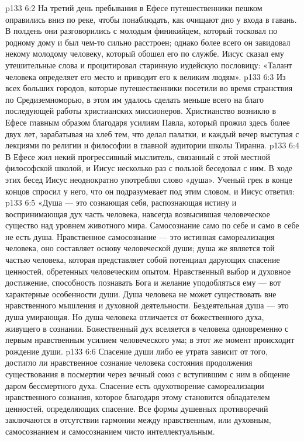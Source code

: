 \vs p133 6:2 На третий день пребывания в Ефесе путешественники пешком оправились вниз по реке, чтобы понаблюдать, как очищают дно у входа в гавань. В полдень они разговорились с молодым финикийцем, который тосковал по родному дому и был чем\hyp{}то сильно расстроен; однако более всего он завидовал некому молодому человеку, который обошел его по службе. Иисус сказал ему утешительные слова и процитировал старинную иудейскую пословицу: «Талант человека определяет его место и приводит его к великим людям».
\vs p133 6:3 Из всех больших городов, которые путешественники посетили во время странствия по Средиземноморью, в этом им удалось сделать меньше всего на благо последующей работы христианских миссионеров. Христианство возникло в Ефесе главным образом благодаря усилиям Павла, который прожил здесь более двух лет, зарабатывая на хлеб тем, что делал палатки, и каждый вечер выступая с лекциями по религии и философии в главной аудитории школы Тиранна.
\vs p133 6:4 В Ефесе жил некий прогрессивный мыслитель, связанный с этой местной философской школой, и Иисус несколько раз с пользой беседовал с ним. В ходе этих бесед Иисус неоднократно употреблял слово «душа». Ученый грек в конце концов спросил у него, что он подразумевает под этим словом, и Иисус ответил:
\vs p133 6:5 \pc «Душа --- это сознающая себя, распознающая истину и воспринимающая дух часть человека, навсегда возвысившая человеческое существо над уровнем животного мира. Самосознание само по себе и само в себе не есть душа. Нравственное самосознание --- это истинная самореализация человека, оно составляет основу человеческой души; душа же является той частью человека, которая представляет собой потенциал дарующих спасение ценностей, обретенных человеческим опытом. Нравственный выбор и духовное достижение, способность познавать Бога и желание уподобляться ему --- вот характерные особенности души. Душа человека не может существовать вне нравственного мышления и духовной деятельности. Бездеятельная душа --- это душа умирающая. Но душа человека отличается от божественного духа, живущего в сознании. Божественный дух вселяется в человека одновременно с первым нравственным усилием человеческого ума; в этот же момент происходит рождение души.
\vs p133 6:6 Спасение души либо ее утрата зависит от того, достигло ли нравственное сознание человека состояния продолжения существования в посмертии через вечный союз с вступившим с ним в общение даром бессмертного духа. Спасение есть одухотворение самореализации нравственного сознания, которое благодаря этому становится обладателем ценностей, определяющих спасение. Все формы душевных противоречий заключаются в отсутствии гармонии между нравственным, или духовным, самосознанием и самосознанием чисто интеллектуальным.
